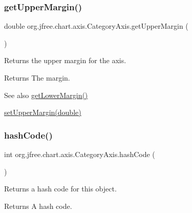 \subsubsection{\texorpdfstring{get\+Upper\+Margin()}{getUpperMargin()}}
{\footnotesize\ttfamily double org.\+jfree.\+chart.\+axis.\+Category\+Axis.\+get\+Upper\+Margin (\begin{DoxyParamCaption}{ }\end{DoxyParamCaption})}

Returns the upper margin for the axis.

\begin{DoxyReturn}{Returns}
The margin.
\end{DoxyReturn}
\begin{DoxySeeAlso}{See also}
\mbox{\hyperlink{classorg_1_1jfree_1_1chart_1_1axis_1_1_category_axis_aa43dece7ed3eeb9179b874befee56d0f}{get\+Lower\+Margin()}} 

\mbox{\hyperlink{classorg_1_1jfree_1_1chart_1_1axis_1_1_category_axis_ac33882eb8c882b5d1750d349870fce65}{set\+Upper\+Margin(double)}} 
\end{DoxySeeAlso}
\mbox{\label{classorg_1_1jfree_1_1chart_1_1axis_1_1_category_axis_a07d2330604ff51eb37569de16343a12a}} 
\subsubsection{\texorpdfstring{hash\+Code()}{hashCode()}}
{\footnotesize\ttfamily int org.\+jfree.\+chart.\+axis.\+Category\+Axis.\+hash\+Code (\begin{DoxyParamCaption}{ }\end{DoxyParamCaption})}

Returns a hash code for this object.

\begin{DoxyReturn}{Returns}
A hash code. 
\end{DoxyReturn}
\mbox{\label{classorg_1_1jfree_1_1chart_1_1axis_1_1_category_axis_ab4d7f543ddb1fd823e44a215cc504be3}} 
